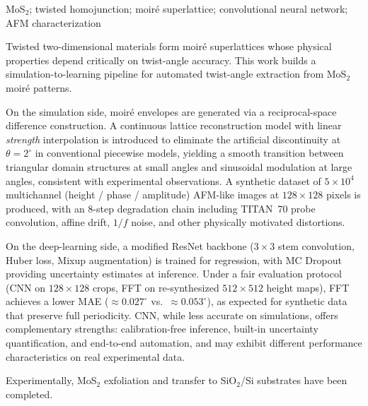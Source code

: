 \documentclass[supercite]{HustGraduPaper}
\begin{document}
\begin{enabstract}{MoS$_2$; twisted homojunction; moiré superlattice; convolutional neural network; AFM characterization}

Twisted two-dimensional materials form moiré superlattices whose physical properties depend critically on twist-angle accuracy. This work builds a simulation-to-learning pipeline for automated twist-angle extraction from MoS$_2$ moiré patterns.

On the simulation side, moiré envelopes are generated via a reciprocal-space difference construction. A continuous lattice reconstruction model with linear \textit{strength} interpolation is introduced to eliminate the artificial discontinuity at $\theta = 2^{\circ}$ in conventional piecewise models, yielding a smooth transition between triangular domain structures at small angles and sinusoidal modulation at large angles, consistent with experimental observations. A synthetic dataset of $5\times10^4$ multichannel (height / phase / amplitude) AFM-like images at $128{\times}128$ pixels is produced, with an 8-step degradation chain including TITAN~70 probe convolution, affine drift, $1/f$ noise, and other physically motivated distortions.

On the deep-learning side, a modified ResNet backbone ($3{\times}3$ stem convolution, Huber loss, Mixup augmentation) is trained for regression, with MC Dropout providing uncertainty estimates at inference. Under a fair evaluation protocol (CNN on $128{\times}128$ crops, FFT on re-synthesized $512{\times}512$ height maps), FFT achieves a lower MAE ($\approx 0.027^{\circ}$ vs.\ $\approx 0.053^{\circ}$), as expected for synthetic data that preserve full periodicity. CNN, while less accurate on simulations, offers complementary strengths: calibration-free inference, built-in uncertainty quantification, and end-to-end automation, and may exhibit different performance characteristics on real experimental data.

Experimentally, MoS$_2$ exfoliation and transfer to SiO$_2$/Si substrates have been completed.

\end{enabstract}

\tableofcontents[pagenum=true]
\end{document}
